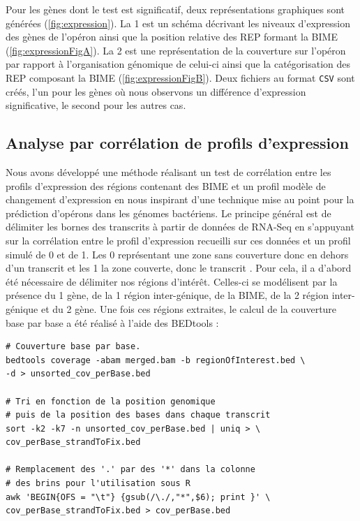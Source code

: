 \documentclass[12pt,a4paper]{report}
\begin{document}
\begin{onehalfspace}
Pour les gènes dont le test est significatif, deux représentations graphiques sont générées (\autoref{fig:expression}). La 1 est un schéma décrivant les niveaux d'expression des gènes de l'opéron ainsi que la position relative des REP formant la BIME (\autoref{fig:expressionFigA}). La 2 est une représentation de la couverture sur l'opéron par rapport à l'organisation génomique de celui-ci ainsi que la catégorisation des REP composant la BIME (\autoref{fig:expressionFigB}). Deux fichiers au format \texttt{CSV} sont créés, l'un pour les gènes où nous observons un différence d'expression significative, le second pour les autres cas.

\subsection*{Analyse par corrélation de profils d'expression}
Nous avons développé une méthode réalisant un test de corrélation entre les profils d'expression des régions contenant des BIME et un profil modèle de changement d'expression en nous inspirant d'une technique mise au point pour la prédiction d'opérons dans les génomes bactériens. Le principe général est de délimiter les bornes des transcrits à partir de données de RNA-Seq en s'appuyant sur la corrélation entre le profil d'expression recueilli sur ces données et un profil simulé de 0 et de 1. Les 0 représentant une zone sans couverture donc en dehors d'un transcrit et les 1 la zone couverte, donc le transcrit \citep{Fortino2014}. Pour cela, il a d'abord été nécessaire de délimiter nos régions d'intérêt. Celles-ci se modélisent par la présence du 1 gène, de la 1 région inter-génique, de la BIME, de la 2 région inter-génique et du 2 gène. Une fois ces régions extraites, le calcul de la couverture base par base a été réalisé à l'aide des BEDtools :
\begin{lstlisting}[frame=single]
# Couverture base par base.
bedtools coverage -abam merged.bam -b regionOfInterest.bed \
-d > unsorted_cov_perBase.bed

# Tri en fonction de la position genomique 
# puis de la position des bases dans chaque transcrit
sort -k2 -k7 -n unsorted_cov_perBase.bed | uniq > \
cov_perBase_strandToFix.bed

# Remplacement des '.' par des '*' dans la colonne
# des brins pour l'utilisation sous R
awk 'BEGIN{OFS = "\t"} {gsub(/\./,"*",$6); print }' \
cov_perBase_strandToFix.bed > cov_perBase.bed
\end{lstlisting}


\end{onehalfspace}
\end{document}
